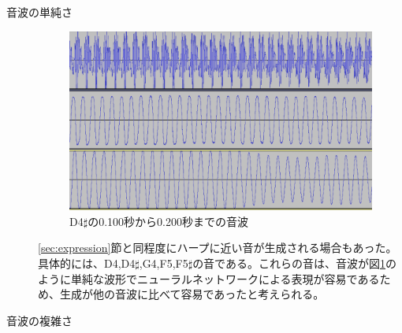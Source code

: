 \begin{description}
\item[音波の単純さ]\mbox{}

\begin{figure}[t]
\begin{center}
\includegraphics[width=0.7\hsize]{figure/66_22_det/d4s_0100_0200.png}
\caption{D4$\sharp$の0.100秒から0.200秒までの音波}
\label{fig:66_22_near}
\end{center}
\end{figure}

\ref{sec:expression}節と同程度にハープに近い音が生成される場合もあった。具体的には、D4,D4$\sharp$,G4,F5,F5$\sharp$の音である。これらの音は、音波が図\ref{fig:66_22_near}のように単純な波形でニューラルネットワークによる表現が容易であるため、生成が他の音波に比べて容易であったと考えられる。

\item[音波の複雑さ]\mbox{}


\end{description}

